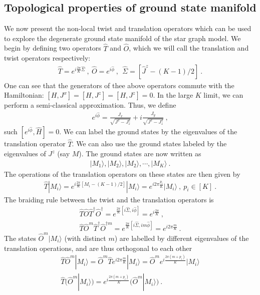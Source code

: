 \documentclass{iopart}
\begin{document}
\subsection{Topological properties of ground state manifold}
\label{sec:topo_ground_state}
We now present the non-local twist and translation operators which can be used to explore the degenerate ground state manifold of the star graph model.
We begin by defining two operators $\hat{T}$ and $\hat{O}$, which we will call the translation and twist operators respectively: 
\begin{eqnarray}
\hat{T} = e^{i\frac{2\pi}{K} \hat{\Sigma}} ~,~\hat{O} = e^{i\hat{\phi}}~,~~\hat{\Sigma}=[\hat{J}^z-(K-1)/2]~.
\end{eqnarray}
One can see that the generators of thee above operators commute with the Hamiltonian: $[H,J^x]=[H,J^z]=[H,J^z]=0$. In the large \(K\) limit, we can perform a semi-classical approximation. 
Thus, we define
\begin{eqnarray}
e^{i\hat{\phi}} = \frac{J_{x}}{\sqrt{J^{2} - J_{z}^{2}}} + i\frac{J_{y}}{\sqrt{J^{2} - J_{z}^{2}}}~,
\end{eqnarray}
such $[e^{i\hat{\phi}},\hat{H}]=0$. We can label the ground states by the eigenvalues of the translation operator $\hat{T}$. We can also use the ground states labeled by the eigenvalues of $J^z$ (say $M$). The ground states are now written as 
\begin{eqnarray}
|M_1\rangle,|M_2\rangle,|M_2\rangle,\cdots ,|M_K\rangle~.
\end{eqnarray}
The operations of the translation operators on these states are then given by
\begin{eqnarray}
\hat{T}|M_i\rangle = e^{i\frac{2\pi}{K} [M_i-(K-1)/2]} |M_i\rangle = e^{i2\pi\frac{p_i}{K} } |M_i\rangle~,~p_i\in[K]~.
\end{eqnarray}
The braiding rule between the twist and the translation operators is
\begin{eqnarray}
\hat{T}\hat{O}\hat{T}^{\dagger}\hat{O}^{\dagger} = e^{\frac{2\pi }{K}[i\hat{\Sigma},i\hat{\phi}]}=e^{i\frac{2\pi }{K}} ~,\nonumber\\
\hat{T}\hat{O}^m\hat{T}^{\dagger}\hat{O}^{\dagger m} = e^{\frac{2\pi }{K}[i\hat{\Sigma},im\hat{\phi}]}=e^{i2\pi \frac{m}{K}}~.
\end{eqnarray}
The states $\hat{O}^m |M_i\rangle$ (with distinct $m$) are labelled by different eigenvalues of the translation operations, and are thus orthogonal to each other
\begin{eqnarray}
\hat{T} \hat{O}^m |M_i\rangle = \hat{O}^m \hat{T} e^{i2\pi \frac{m}{K}} |M_i\rangle =\hat{O}^m e^{i \frac{2\pi(m+p_i)}{K} } |M_i\rangle \\
\hat{T} \bigg(\hat{O}^m |M_i\rangle \bigg) = e^{i \frac{2\pi(m+p_i)}{K} } \bigg( \hat{O}^m |M_i\rangle \bigg)~.
\end{eqnarray}
\end{document}

